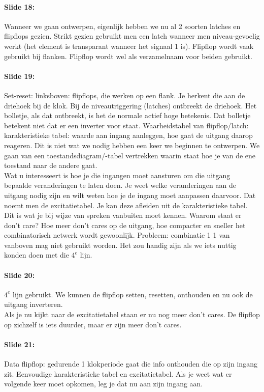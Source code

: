 \documentclass[10pt,a4paper]{book}
\begin{document}
\paragraph{Slide 18:} Wanneer we gaan ontwerpen, eigenlijk hebben we nu al 2 soorten latches en flipflops gezien. Strikt gezien gebruikt men een latch wanneer men niveau-gevoelig werkt (het element is transparant wanneer het signaal 1 is). Flipflop wordt vaak gebruikt bij flanken. Flipflop wordt wel als verzamelnaam voor beiden gebruikt.

\paragraph{Slide 19:} Set-reset: linksboven: flipflops, die werken op een flank. Je herkent die aan de driehoek bij de klok. Bij de niveautriggering (latches) ontbreekt de driehoek. Het bolletje, als dat ontbreekt, is het de normale actief hoge betekenis. Dat bolletje betekent niet dat er een inverter voor staat. Waarheidstabel van flipflop/latch: karakteristieke tabel: waarde aan ingang aanleggen, hoe gaat de uitgang daarop reageren. Dit is niet wat we nodig hebben een keer we beginnen te ontwerpen. We gaan van een toestandsdiagram/-tabel vertrekken waarin staat hoe je van de ene toestand naar de andere gaat.\\
Wat u interesseert is hoe je die ingangen moet aansturen om die uitgang bepaalde veranderingen te laten doen. Je weet welke veranderingen aan de uitgang nodig zijn en wilt weten hoe je de ingang moet aanpassen daarvoor. Dat noemt men de excitatietabel. Je kan deze afleiden uit de karakteristieke tabel. Dit is wat je bij wijze van spreken vanbuiten moet kennen. Waarom staat er don't care? Hoe meer don't cares op de uitgang, hoe compacter en sneller het combinatorisch netwerk wordt gewoonlijk. Probleem: combinatie 1 1 van vanboven mag niet gebruikt worden. Het zou handig zijn als we iets nuttig konden doen met die $4^e$ lijn.

\paragraph{Slide 20:} $4^e$ lijn gebruikt. We kunnen de flipflop setten, resetten, onthouden en nu ook de uitgang inverteren.\\
Als je nu kijkt naar de excitatietabel staan er nu nog meer don't cares. De flipflop op zichzelf is iets duurder, maar er zijn meer don't cares.

\paragraph{Slide 21:} Data flipflop: gedurende 1 klokperiode gaat die info onthouden die op zijn ingang zit. Eenvoudige karakteristieke tabel en excitatietabel. Als je weet wat er volgende keer moet opkomen, leg je dat nu aan zijn ingang aan. 
\end{document}
